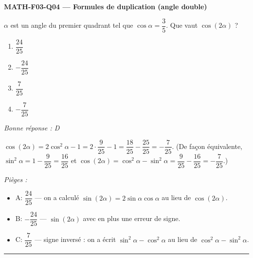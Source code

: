 \documentclass[11pt,a4paper]{article}
\begin{document}
\noindent\textbf{MATH-F03-Q04 --- Formules de duplication (angle double)}\par
$\alpha$ est un angle du premier quadrant tel que $\cos\alpha=\dfrac{3}{5}$. Que vaut $\cos(2\alpha)$ ?
\begin{enumerate}[label=\Alph*)]
\item $\dfrac{24}{25}$
\item $-\dfrac{24}{25}$
\item $\dfrac{7}{25}$
\item $-\dfrac{7}{25}$
\end{enumerate}
\textit{Bonne réponse : D}\par
$\cos(2\alpha)=2\cos^2\alpha-1=2\cdot\dfrac{9}{25}-1=\dfrac{18}{25}-\dfrac{25}{25}=-\dfrac{7}{25}$. (De façon équivalente, $\sin^2\alpha=1-\dfrac{9}{25}=\dfrac{16}{25}$ et $\cos(2\alpha)=\cos^2\alpha-\sin^2\alpha=\dfrac{9}{25}-\dfrac{16}{25}=-\dfrac{7}{25}$.)\par
\textit{Pièges :}
\begin{itemize}
\item A: $\dfrac{24}{25}$ --- on a calculé $\sin(2\alpha)=2\sin\alpha\cos\alpha$ au lieu de $\cos(2\alpha)$.
\item B: $-\dfrac{24}{25}$ --- $\sin(2\alpha)$ avec en plus une erreur de signe.
\item C: $\dfrac{7}{25}$ --- signe inversé : on a écrit $\sin^2\alpha-\cos^2\alpha$ au lieu de $\cos^2\alpha-\sin^2\alpha$.
\end{itemize}
\vspace{8pt}\hrule\vspace{8pt}
\end{document}
